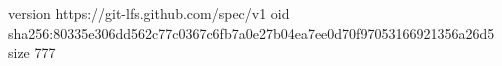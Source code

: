 version https://git-lfs.github.com/spec/v1
oid sha256:80335e306dd562c77c0367c6fb7a0e27b04ea7ee0d70f97053166921356a26d5
size 777
